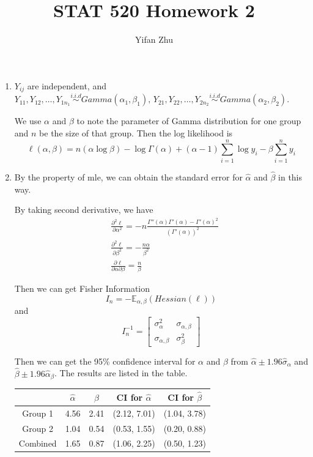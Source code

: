 \documentclass{article}
\begin{document}
	

	
	\title{STAT 520 Homework 2}
	\author{Yifan Zhu}
	\maketitle
	
	\begin{enumerate}[leftmargin = 0 em, label = \arabic*., font = \bfseries]
	\item 
	$Y_{ij}$ are independent, and $Y_{11}, Y_{12}, \ldots , Y_{1n_{1}} \overset{i.i.d}{\sim} Gamma(\alpha_1, \beta_1),\, Y_{21}, Y_{22}, \ldots , Y_{2n_{2}} \overset{i.i.d}{\sim} Gamma(\alpha_2, \beta_2)$.

	We use $\alpha$ and $\beta$ to note the parameter of Gamma distribution for one group and $n$ be the size of that group. Then the log likelihood is 
	\[\ell (\alpha , \beta ) = n(\alpha \log \beta) - \log \Gamma(\alpha) + (\alpha - 1)\sum_{i=1}^n \log y_i - \beta \sum_{i=1}^n y_i\]


	\item 
    By the property of mle, we can obtain the standard error for $\hat{\alpha}$ and $\hat{\beta}$ in this way.

	By taking second derivative, we have
	\begin{align*}
	&\frac{\partial^2 \ell}{\partial \alpha^2} = -n \frac{\Gamma''(\alpha) \Gamma'(\alpha) - {\Gamma'(\alpha)}^2}{(\Gamma'(\alpha))^2}\\
	&\frac{\partial^2 \ell}{\partial \beta^2} = -\frac{n \alpha}{\beta^2}\\
    &\frac{\partial \ell}{\partial \alpha \partial \beta} = \frac{n}{\beta}
	\end{align*}

	Then we can get Fisher Information
	\[I_n = - \mathbb{E}_{\alpha, \beta}(Hessian(\ell))\]
	and 
	\[I_n^{-1} = \begin{bmatrix}
		\sigma_\alpha^2 & \sigma_{\alpha, \beta}\\
		\sigma_{\alpha, \beta} & \sigma_\beta^2
	\end{bmatrix}\]
	
	Then we can get the 95\% confidence interval for $\alpha$ and $\beta$ from $\hat{\alpha} \pm 1.96 \hat{\sigma}_\alpha$ and $\hat{\beta} \pm 1.96 \hat{\alpha}_\beta$. The results are listed in the table.
\begin{center}
	\begin{tabular}{ccccc}
	\toprule
	         & $\hat{\alpha}$ & $\hat{\beta}$ & CI for $\hat{\alpha}$ & CI for $\hat{\beta}$\\ 
	         \midrule
	 Group 1 &  4.56&  2.41&  (2.12, 7.01)& (1.04, 3.78)   \\
	 Group 2 &  1.04&  0.54&  (0.53, 1.55)& (0.20, 0.88)  \\
	 Combined & 1.65&  0.87&  (1.06, 2.25)& (0.50, 1.23)\\
	 \bottomrule
	\end{tabular}
	\end{center}


\end{enumerate}
\end{document}
